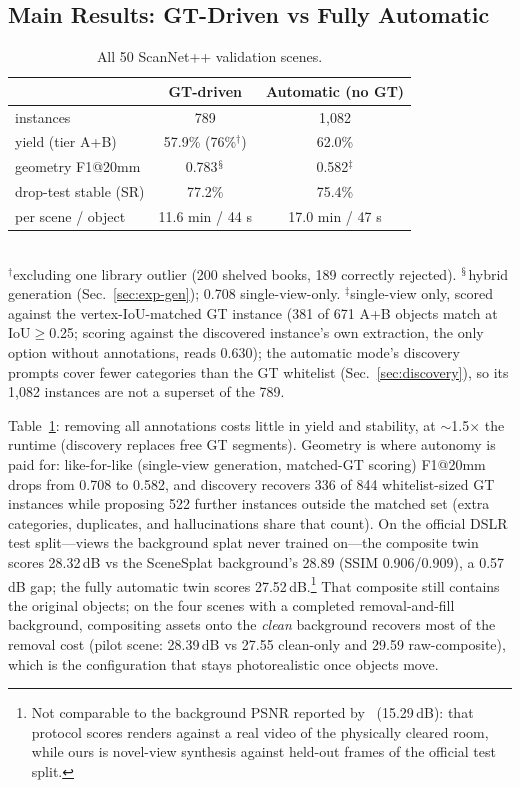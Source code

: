 \subsection{Main Results: GT-Driven vs Fully Automatic}
\begin{table}[t]
\caption{All 50 ScanNet++ validation scenes.}
\label{tab:main}
\centering\small
\begin{tabular}{lcc}
\toprule
 & GT-driven & Automatic (no GT) \\
\midrule
instances & 789 & 1{,}082 \\
yield (tier A+B) & 57.9\% (76\%$^\dagger$) & 62.0\% \\
geometry F1@20mm & 0.783$^{\mathsection}$ & 0.582$^\ddagger$ \\
drop-test stable (SR) & 77.2\% & 75.4\% \\
per scene / object & 11.6 min / 44 s & 17.0 min / 47 s \\
\bottomrule
\end{tabular}\\[2pt]
{\footnotesize $^\dagger$excluding one library outlier (200 shelved
books, 189 correctly rejected). $^{\mathsection}$hybrid generation
(Sec.~\ref{sec:exp-gen}); 0.708 single-view-only. $^\ddagger$single-view
only, scored against the vertex-IoU-matched GT instance (381 of 671 A+B
objects match at IoU$\geq$0.25; scoring against the discovered
instance's own extraction, the only option without annotations, reads
0.630); the automatic mode's discovery prompts cover fewer categories
than the GT whitelist (Sec.~\ref{sec:discovery}), so its 1{,}082
instances are not a superset of the 789.}
\end{table}

Table~\ref{tab:main}: removing all annotations costs little in yield
and stability, at $\sim$1.5$\times$ the runtime (discovery replaces
free GT segments). Geometry is where autonomy is paid for: like-for-like
(single-view generation, matched-GT scoring) F1@20mm drops from 0.708
to 0.582, and discovery recovers 336 of 844 whitelist-sized GT
instances while proposing 522 further instances outside the matched
set (extra categories, duplicates, and hallucinations share that
count). On the official DSLR test split---views the background splat
never trained on---the composite twin scores 28.32\,dB vs the
SceneSplat background's 28.89 (SSIM 0.906/0.909), a 0.57\,dB gap; the
fully automatic twin scores 27.52\,dB.\footnote{Not comparable to the
background PSNR reported by~\cite{simfoundry} (15.29\,dB): that protocol
scores renders against a real video of the physically cleared room, while
ours is novel-view synthesis against held-out frames of the official test
split.} That composite still contains
the original objects; on the four scenes with a completed
removal-and-fill background, compositing assets onto the \emph{clean}
background recovers most of the removal cost (pilot scene: 28.39\,dB vs
27.55 clean-only and 29.59 raw-composite), which is the configuration
that stays photorealistic once objects move.

